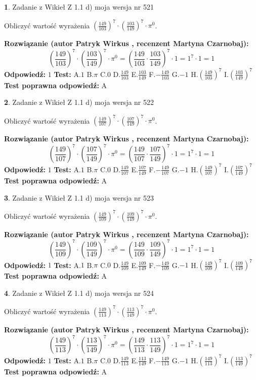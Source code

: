 \documentclass[12pt, a4paper]{article}
\theoremstyle{definition} %
\newtheorem{zad}{}
\newcommand{\zadStart}[1]{\begin{zad}#1\newline}
\newcommand{\zadStop}{\end{zad}}
\newcommand{\rozwStart}[2]{\noindent \textbf{Rozwiązanie (autor #1 , recenzent #2): }\newline}
\newcommand{\rozwStop}{\newline}
\newcommand{\odpStart}{\noindent \textbf{Odpowiedź:}\newline}
\newcommand{\odpStop}{\newline}
\newcommand{\testStart}{\noindent \textbf{Test:}\newline}
\newcommand{\testStop}{\newline}
\newcommand{\kluczStart}{\noindent \textbf{Test poprawna odpowiedź:}\newline}
\newcommand{\kluczStop}{\newline}
\begin{document}
\zadStart{Zadanie z Wikieł Z 1.1 d) moja wersja nr 521}

Obliczyć wartość wyrażenia $(\frac{149}{103})^{7} \cdot (\frac{103}{149})^{7} \cdot \pi^{0}$.
\zadStop
\rozwStart{Patryk Wirkus}{Martyna Czarnobaj}
$$(\frac{149}{103})^{7} \cdot (\frac{103}{149})^{7} \cdot \pi^{0} = (\frac{149}{103} \cdot \frac{103}{149})^{7} \cdot 1 = 1^{7} \cdot 1 = 1$$
\rozwStop
\odpStart
$1$
\odpStop
\testStart
A.$1$ B.$\pi$ C.$0$ D.$\frac{149}{103}$ E.$\frac{103}{149}$
F.$-\frac{149}{103}$ G.$-1$
H.$(\frac{149}{103})^{7}$
I.$(\frac{103}{149})^{7}$
\testStop
\kluczStart
A
\kluczStop



\zadStart{Zadanie z Wikieł Z 1.1 d) moja wersja nr 522}

Obliczyć wartość wyrażenia $(\frac{149}{107})^{7} \cdot (\frac{107}{149})^{7} \cdot \pi^{0}$.
\zadStop
\rozwStart{Patryk Wirkus}{Martyna Czarnobaj}
$$(\frac{149}{107})^{7} \cdot (\frac{107}{149})^{7} \cdot \pi^{0} = (\frac{149}{107} \cdot \frac{107}{149})^{7} \cdot 1 = 1^{7} \cdot 1 = 1$$
\rozwStop
\odpStart
$1$
\odpStop
\testStart
A.$1$ B.$\pi$ C.$0$ D.$\frac{149}{107}$ E.$\frac{107}{149}$
F.$-\frac{149}{107}$ G.$-1$
H.$(\frac{149}{107})^{7}$
I.$(\frac{107}{149})^{7}$
\testStop
\kluczStart
A
\kluczStop



\zadStart{Zadanie z Wikieł Z 1.1 d) moja wersja nr 523}

Obliczyć wartość wyrażenia $(\frac{149}{109})^{7} \cdot (\frac{109}{149})^{7} \cdot \pi^{0}$.
\zadStop
\rozwStart{Patryk Wirkus}{Martyna Czarnobaj}
$$(\frac{149}{109})^{7} \cdot (\frac{109}{149})^{7} \cdot \pi^{0} = (\frac{149}{109} \cdot \frac{109}{149})^{7} \cdot 1 = 1^{7} \cdot 1 = 1$$
\rozwStop
\odpStart
$1$
\odpStop
\testStart
A.$1$ B.$\pi$ C.$0$ D.$\frac{149}{109}$ E.$\frac{109}{149}$
F.$-\frac{149}{109}$ G.$-1$
H.$(\frac{149}{109})^{7}$
I.$(\frac{109}{149})^{7}$
\testStop
\kluczStart
A
\kluczStop



\zadStart{Zadanie z Wikieł Z 1.1 d) moja wersja nr 524}

Obliczyć wartość wyrażenia $(\frac{149}{113})^{7} \cdot (\frac{113}{149})^{7} \cdot \pi^{0}$.
\zadStop
\rozwStart{Patryk Wirkus}{Martyna Czarnobaj}
$$(\frac{149}{113})^{7} \cdot (\frac{113}{149})^{7} \cdot \pi^{0} = (\frac{149}{113} \cdot \frac{113}{149})^{7} \cdot 1 = 1^{7} \cdot 1 = 1$$
\rozwStop
\odpStart
$1$
\odpStop
\testStart
A.$1$ B.$\pi$ C.$0$ D.$\frac{149}{113}$ E.$\frac{113}{149}$
F.$-\frac{149}{113}$ G.$-1$
H.$(\frac{149}{113})^{7}$
I.$(\frac{113}{149})^{7}$
\testStop
\kluczStart
A
\kluczStop
\end{document}
